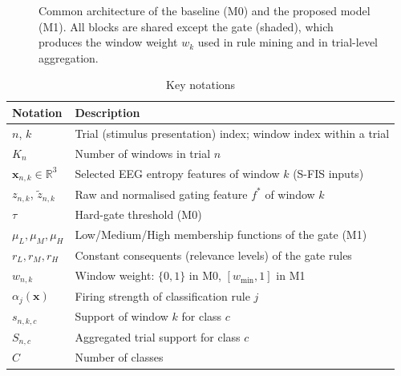 \begin{figure}[t]
\caption{Common architecture of the baseline (M0) and the proposed model (M1). All blocks are shared except the gate (shaded), which produces the window weight $w_k$ used in rule mining and in trial-level aggregation.}
\label{fig:arch}
\end{figure}

\begin{table}[t]
\centering\small
\caption{Key notations}\label{tab:notation}
\begin{tabular}{@{}ll@{}}
\toprule
Notation & Description\\
\midrule
$n$, $k$ & Trial (stimulus presentation) index; window index within a trial\\
$K_n$ & Number of windows in trial $n$\\
$\mathbf{x}_{n,k}\in\mathbb{R}^{3}$ & Selected EEG entropy features of window $k$ (S-FIS inputs)\\
$z_{n,k}$, $\tilde z_{n,k}$ & Raw and normalised gating feature $f^\ast$ of window $k$\\
$\tau$ & Hard-gate threshold (M0)\\
$\mu_{L},\mu_{M},\mu_{H}$ & Low/Medium/High membership functions of the gate (M1)\\
$r_{L},r_{M},r_{H}$ & Constant consequents (relevance levels) of the gate rules\\
$w_{n,k}$ & Window weight: $\{0,1\}$ in M0, $[w_{\min},1]$ in M1\\
$\alpha_j(\mathbf{x})$ & Firing strength of classification rule $j$\\
$s_{n,k,c}$ & Support of window $k$ for class $c$\\
$S_{n,c}$ & Aggregated trial support for class $c$\\
$C$ & Number of classes\\
\bottomrule
\end{tabular}
\end{table}
